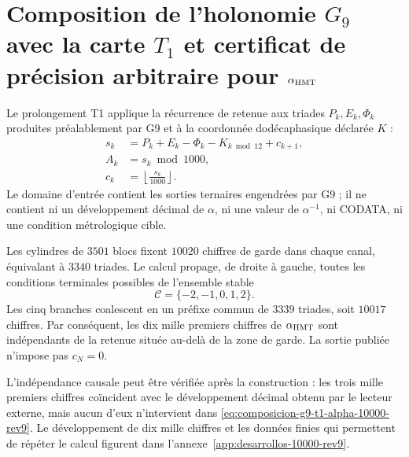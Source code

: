 \section{Composition de l’holonomie \(G_9\) avec la carte \(T_1\) et certificat de précision arbitraire pour \(\alpha_{\rm HMT}\)}
\label{sec:alpha-t1-10000-rev9}

Le prolongement T1 applique la récurrence de retenue aux triades
\(P_k,E_k,\Phi_k\) produites préalablement par G9 et à la coordonnée
dodécaphasique déclarée \(K\) :
\begin{align}
 s_k&=P_k+E_k-\Phi_k-K_{k\bmod12}+c_{k+1},\\
 A_k&=s_k\bmod1000,\\
 c_k&=\left\lfloor\frac{s_k}{1000}\right\rfloor.
 \label{eq:composicion-g9-t1-alpha-10000-rev9}
\end{align}
Le domaine d’entrée contient les sorties ternaires engendrées par G9 ; il ne
contient ni un développement décimal de \(\alpha\), ni une valeur de
\(\alpha^{-1}\), ni CODATA, ni une condition métrologique cible.

Les cylindres de \(3501\) blocs fixent \(10020\) chiffres de garde dans chaque
canal, équivalant à \(3340\) triades. Le calcul propage, de droite à
gauche, toutes les conditions terminales possibles de l’ensemble stable
\[
 \mathcal C=\{-2,-1,0,1,2\}.
\]
Les cinq branches coalescent en un préfixe commun de \(3339\) triades, soit
\(10017\) chiffres. Par conséquent, les dix mille premiers chiffres de
\(\alpha_{\rm HMT}\) sont indépendants de la retenue située au-delà de la
zone de garde. La sortie publiée n’impose pas \(c_N=0\).

L’indépendance causale peut être vérifiée après la construction : les
trois mille premiers chiffres coïncident avec le développement décimal obtenu par le
lecteur externe, mais aucun d’eux n’intervient dans
\eqref{eq:composicion-g9-t1-alpha-10000-rev9}. Le développement de dix mille
chiffres et les données finies qui permettent de répéter le calcul figurent dans
l’annexe~\ref{app:desarrollos-10000-rev9}.
